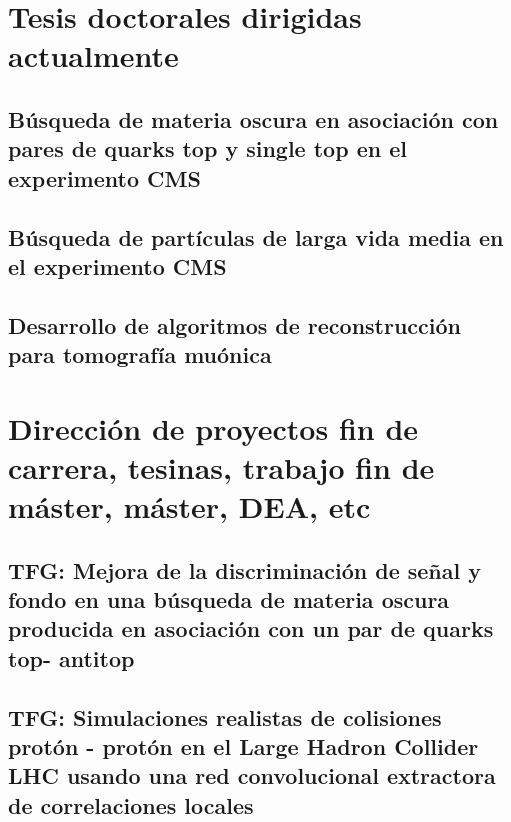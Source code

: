 \documentclass[a4paper, 11pt, twoside, openright]{report}
\begin{document}
\section{Tesis doctorales dirigidas actualmente}

\subsection{Búsqueda de materia oscura en asociación con pares de quarks top y single top en el experimento CMS}


\subsection{Búsqueda de partículas de larga vida media en el experimento CMS}


\subsection{Desarrollo de algoritmos de reconstrucción para tomografía muónica}



\section{Dirección de proyectos fin de carrera, tesinas, trabajo fin de máster, máster, DEA, etc}

\subsection{TFG: Mejora de la discriminación de señal y fondo en una búsqueda de materia oscura producida en asociación con un par de quarks top- antitop}


\subsection{TFG: Simulaciones realistas de colisiones protón - protón en el Large Hadron Collider LHC usando una red convolucional extractora de correlaciones locales}

\end{document}
